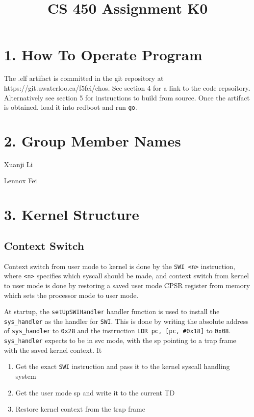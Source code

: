 \documentclass{article}
\title{CS 450 Assignment K0}
\date{}
\begin{document}
\maketitle


\section*{1. How To Operate Program}

The .elf artifact is committed in the git repository at https://git.uwaterloo.ca/f5fei/chos. See section 4 for a link to the code repsoitory. Alternatively see section 5 for instructions to build from source. Once the artifact is obtained, load it into redboot and run \texttt{go}.

\section*{2. Group Member Names}

Xuanji Li

Lennox Fei

\section*{3. Kernel Structure}

\subsection*{Context Switch}

Context switch from user mode to kernel is done by the \texttt{SWI <n>} instruction, where \texttt{<n>} specifies which syscall should be made, and context switch from kernel to user mode is done by restoring a saved user mode CPSR register from memory which sets the processor mode to user mode.

At startup, the \texttt{setUpSWIHandler} handler function is used to install the \texttt{sys\_handler} as the handler for \texttt{SWI}. This is done by writing the absolute address of \texttt{sys\_handler} to \texttt{0x28} and the instruction \texttt{LDR pc, [pc, \#0x18]} to \texttt{0x08}. \texttt{sys\_handler} expects to be in svc mode, with the sp pointing to a trap frame with the saved kernel context. It

\begin{enumerate}
\item Get the exact \texttt{SWI} instruction and pass it to the kernel syscall handling system
\item Get the user mode sp and write it to the current TD
\item Restore kernel context from the trap frame
\end{enumerate}
\end{document}
